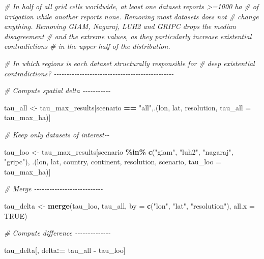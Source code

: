 \documentclass[
  11pt,
]{article}
\newenvironment{Shaded}{\begin{snugshade}}{\end{snugshade}}
\newcommand{\AttributeTok}[1]{\textcolor[rgb]{0.13,0.29,0.53}{#1}}
\newcommand{\CommentTok}[1]{\textcolor[rgb]{0.56,0.35,0.01}{\textit{#1}}}
\newcommand{\ConstantTok}[1]{\textcolor[rgb]{0.56,0.35,0.01}{#1}}
\newcommand{\FunctionTok}[1]{\textcolor[rgb]{0.13,0.29,0.53}{\textbf{#1}}}
\newcommand{\NormalTok}[1]{#1}
\newcommand{\OtherTok}[1]{\textcolor[rgb]{0.56,0.35,0.01}{#1}}
\newcommand{\SpecialCharTok}[1]{\textcolor[rgb]{0.81,0.36,0.00}{\textbf{#1}}}
\newcommand{\StringTok}[1]{\textcolor[rgb]{0.31,0.60,0.02}{#1}}
\begin{document}
\begin{Shaded}
\begin{Highlighting}[]
\CommentTok{\# In half of all grid cells worldwide, at least one dataset reports \textgreater{}=1000 ha}
\CommentTok{\# of irrigation while another reports none. Removing most datasets does not}
\CommentTok{\# change anything. Removing GIAM, Nagaraj, LUH2 and GRIPC drops the median disagreement}
\CommentTok{\# and the extreme values, as they particularly increase existential contradictions}
\CommentTok{\# in the upper half of the distribution.}

\CommentTok{\# In which regions is each dataset structurally responsible for}
\CommentTok{\# deep existential contradictions? {-}{-}{-}{-}{-}{-}{-}{-}{-}{-}{-}{-}{-}{-}{-}{-}{-}{-}{-}{-}{-}{-}{-}{-}{-}{-}{-}{-}{-}{-}{-}{-}{-}{-}{-}{-}{-}{-}{-}{-}{-}{-}{-}{-}{-}{-}{-}}

\CommentTok{\# Compute spatial delta {-}{-}{-}{-}{-}{-}{-}{-}{-}{-}{-}}

\NormalTok{tau\_all }\OtherTok{\textless{}{-}}\NormalTok{ tau\_max\_results[scenario }\SpecialCharTok{==} \StringTok{"all"}\NormalTok{,.(lon, lat, resolution,}
                                               \AttributeTok{tau\_all =}\NormalTok{ tau\_max\_ha)]}

\CommentTok{\# Keep only datasets of interest{-}{-}}

\NormalTok{tau\_loo }\OtherTok{\textless{}{-}}\NormalTok{ tau\_max\_results[scenario }\SpecialCharTok{\%in\%} \FunctionTok{c}\NormalTok{(}\StringTok{"giam"}\NormalTok{, }\StringTok{"luh2"}\NormalTok{, }\StringTok{"nagaraj"}\NormalTok{, }\StringTok{"gripc"}\NormalTok{),}
\NormalTok{                           .(lon, lat, country, continent, resolution, scenario,}
                             \AttributeTok{tau\_loo =}\NormalTok{ tau\_max\_ha)]}

\CommentTok{\# Merge {-}{-}{-}{-}{-}{-}{-}{-}{-}{-}{-}{-}{-}{-}{-}{-}{-}{-}{-}{-}{-}{-}{-}{-}{-}{-}{-}}

\NormalTok{tau\_delta }\OtherTok{\textless{}{-}} \FunctionTok{merge}\NormalTok{(tau\_loo, tau\_all, }\AttributeTok{by =} \FunctionTok{c}\NormalTok{(}\StringTok{"lon"}\NormalTok{, }\StringTok{"lat"}\NormalTok{, }\StringTok{"resolution"}\NormalTok{),}
                   \AttributeTok{all.x =} \ConstantTok{TRUE}\NormalTok{)}

\CommentTok{\# Compute difference {-}{-}{-}{-}{-}{-}{-}{-}{-}{-}{-}{-}{-}{-}}

\NormalTok{tau\_delta[, delta}\SpecialCharTok{:=}\NormalTok{ tau\_all }\SpecialCharTok{{-}}\NormalTok{ tau\_loo]}


\end{Highlighting}
\end{Shaded}
\end{document}
